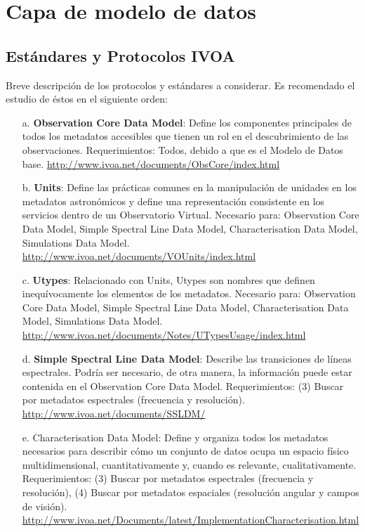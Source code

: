 \section{Capa de modelo de datos}
\subsection{Estándares y Protocolos IVOA}
Breve descripción de los protocolos y estándares a considerar. Es recomendado
el estudio de éstos en el siguiente orden:

\begin{enumerate}
	\item[a.] \textbf{Observation Core Data Model}: Define los componentes
principales de todos los metadatos accesibles que tienen un rol en el
descubrimiento de las observaciones.  Requerimientos: Todos, debido a que es el
Modelo de Datos base. \url{http://www.ivoa.net/documents/ObsCore/index.html} 

	\item[b.] \textbf{Units}: Define las prácticas comunes en la
manipulación de unidades en los metadatos astronómicos y define una
representación consistente en los servicios dentro de un Observatorio Virtual.
Necesario para: Observation Core Data Model, Simple Spectral Line Data Model,
Characterisation Data Model, Simulations Data Model.
\url{http://www.ivoa.net/documents/VOUnits/index.html}

	\item[c.] \textbf{Utypes}: Relacionado con Units, Utypes son nombres
que definen inequívocamente los elementos de los metadatos. Necesario para:
Observation Core Data Model, Simple Spectral Line Data Model, Characterisation
Data Model, Simulations Data Model.
\url{http://www.ivoa.net/documents/Notes/UTypesUsage/index.html}

	\item[d.] \textbf{Simple Spectral Line Data Model}: Describe las
transiciones de líneas espectrales. Podría ser necesario, de otra manera, la
información puede estar contenida en el Observation Core Data Model.
Requerimientos: (3) Buscar por metadatos espectrales (frecuencia y resolución).
\url{http://www.ivoa.net/documents/SSLDM/}

	\item[e.] Characterisation Data Model: Define y organiza todos los
metadatos necesarios para describir cómo un conjunto de datos ocupa un espacio
físico multidimensional, cuantitativamente y, cuando es relevante,
cualitativamente. Requerimientos: (3) Buscar por metadatos espectrales
(frecuencia y resolución), (4) Buscar por metadatos espaciales (resolución
angular y campos de visión).
\url{http://www.ivoa.net/Documents/latest/ImplementationCharacterisation.html}


\end{enumerate}
